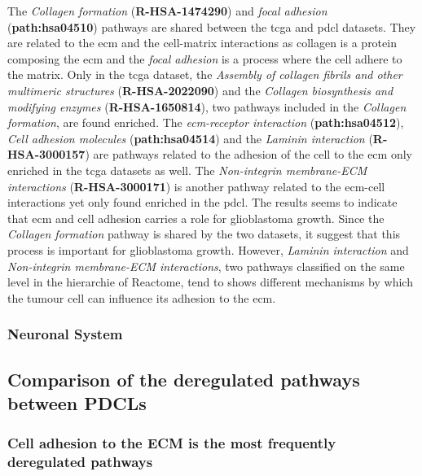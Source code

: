 The \textit{Collagen formation} (\textbf{R-HSA-1474290}) and \textit{focal adhesion} (\textbf{path:hsa04510}) pathways are shared between the \acrshort{tcga} and \acrshort{pdcl} datasets.
They are related to the \acrlong{ecm} and the cell-matrix interactions as collagen is a protein composing the \acrshort{ecm} and the \textit{focal adhesion} is a process where the cell adhere to the matrix.
Only in the \acrshort{tcga} dataset, the \textit{Assembly of collagen fibrils and other multimeric structures} (\textbf{R-HSA-2022090}) and the \textit{Collagen biosynthesis and modifying enzymes} (\textbf{R-HSA-1650814}), two pathways included in the \textit{Collagen formation}, are found enriched.
The \textit{\acrshort{ecm}-receptor interaction} (\textbf{path:hsa04512}), \textit{Cell adhesion molecules} (\textbf{path:hsa04514}) and the \textit{Laminin interaction} (\textbf{R-HSA-3000157}) are pathways related to the adhesion of the cell to the \acrshort{ecm} only enriched in the \acrshort{tcga} datasets as well.
The \textit{Non-integrin membrane-ECM interactions} (\textbf{R-HSA-3000171}) is another pathway related to the \acrshort{ecm}-cell interactions yet only found enriched in the \acrshort{pdcl}.
The results seems to indicate that \acrshort{ecm} and cell adhesion carries a role for glioblastoma growth.
Since the \textit{Collagen formation} pathway is shared by the two datasets, it suggest that this process is important for glioblastoma growth.
However, \textit{Laminin interaction} and \textit{Non-integrin membrane-ECM interactions}, two pathways classified on the same level in the hierarchie of Reactome, tend to shows different mechanisms by which the tumour cell can influence its adhesion to the \acrshort{ecm}.

\subsubsection{Neuronal System}


\subsection{Comparison of the deregulated pathways between PDCLs}

\subsubsection{Cell adhesion to the ECM is the most frequently deregulated pathways}

